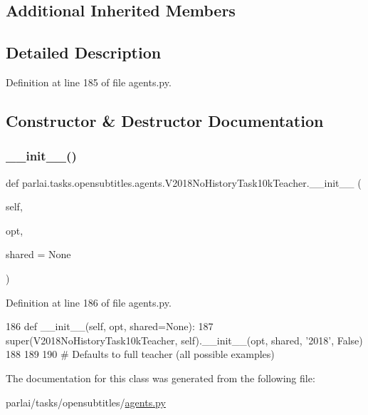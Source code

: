 \subsection*{Additional Inherited Members}


\subsection{Detailed Description}


Definition at line 185 of file agents.\+py.



\subsection{Constructor \& Destructor Documentation}
\mbox{\label{classparlai_1_1tasks_1_1opensubtitles_1_1agents_1_1V2018NoHistoryTask10kTeacher_ace3fc69c7a84c37416b3b50b86735169}} 
\subsubsection{\texorpdfstring{\+\_\+\+\_\+init\+\_\+\+\_\+()}{\_\_init\_\_()}}
{\footnotesize\ttfamily def parlai.\+tasks.\+opensubtitles.\+agents.\+V2018\+No\+History\+Task10k\+Teacher.\+\_\+\+\_\+init\+\_\+\+\_\+ (\begin{DoxyParamCaption}\item[{}]{self,  }\item[{}]{opt,  }\item[{}]{shared = {\ttfamily None} }\end{DoxyParamCaption})}



Definition at line 186 of file agents.\+py.


\begin{DoxyCode}
186     \textcolor{keyword}{def }\_\_init\_\_(self, opt, shared=None):
187         super(V2018NoHistoryTask10kTeacher, self).\_\_init\_\_(opt, shared, \textcolor{stringliteral}{'2018'}, \textcolor{keyword}{False})
188 
189 
190 \textcolor{comment}{# Defaults to full teacher (all possible examples)}
\end{DoxyCode}


The documentation for this class was generated from the following file\+:\begin{DoxyCompactItemize}
\item 
parlai/tasks/opensubtitles/\hyperlink{parlai_2tasks_2opensubtitles_2agents_8py}{agents.\+py}\end{DoxyCompactItemize}

